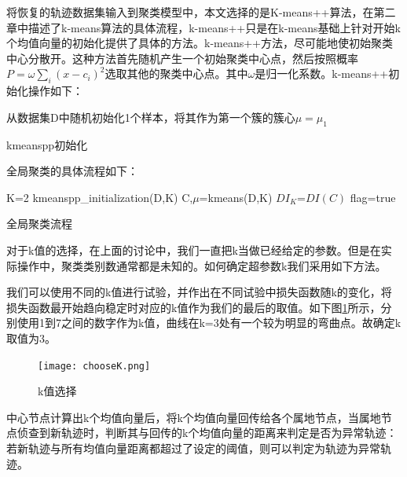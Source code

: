 将恢复的轨迹数据集输入到聚类模型中，本文选择的是K-means++算法，在第二章中描述了k-means算法的具体流程，k-means++只是在k-means基础上针对开始k个均值向量的初始化提供了具体的方法。k-means++方法，尽可能地使初始聚类中心分散开。这种方法首先随机产生一个初始聚类中心点，然后按照概率$P=\omega \sum_i{\left( x-c_i \right) ^2}$选取其他的聚类中心点。其中$\omega$是归一化系数。k-means++初始化操作如下：\\
\begin{algorithm}[H]
	 从数据集D中随机初始化1个样本，将其作为第一个簇的簇心$\mu={\mu_1}$\;
	 \caption{kmeanspp初始化}
\end{algorithm}

全局聚类的具体流程如下：

\begin{algorithm}[H]
	 K=2\;
	 kmeanspp\_initialization(D,K)\;
	 C,$\mu$=kmeans(D,K)\;
	 $DI_K$=$DI(C)$\;
	 flag=true\;
	 \caption{全局聚类流程}
	\label{kmeanspp}
\end{algorithm}

对于k值的选择，在上面的讨论中，我们一直把k当做已经给定的参数。但是在实际操作中，聚类类别数通常都是未知的。如何确定超参数k我们采用如下方法。

我们可以使用不同的k值进行试验，并作出在不同试验中损失函数随k的变化，将损失函数最开始趋向稳定时对应的k值作为我们的最后的取值。如下图\ref{chooseK}所示，分别使用1到7之间的数字作为k值，曲线在k=3处有一个较为明显的弯曲点。故确定k取值为3。
\begin{figure}[H]
	\texttt{[image: chooseK.png]}
	\caption{k值选择}
	\label{chooseK}
\end{figure}

中心节点计算出k个均值向量后，将k个均值向量回传给各个属地节点，当属地节点侦查到新轨迹时，判断其与回传的k个均值向量的距离来判定是否为异常轨迹：若新轨迹与所有均值向量距离都超过了设定的阈值，则可以判定为轨迹为异常轨迹。


